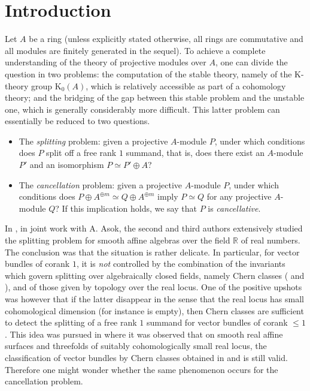 \documentclass[11pt,leqno]{amsart}
\renewcommand{\1}{{\rm 1\hspace*{-0.4ex}%
\rule{0.1ex}{1.52ex}\hspace*{0.2ex}}}
\newcommand{\<}[1]{{\langle}#1 {\rangle}}
\newcommand{\Rb}{\mathbb{R}}
\newcommand{\Kr}{\mathrm{K}}
\theoremstyle{plain}
\theoremstyle{definition}
\theoremstyle{remark}
\numberwithin{equation}{section}
\begin{document}
\section{Introduction}

Let $A$ be a ring (unless explicitly stated otherwise, all rings are commutative and all modules are finitely generated in the sequel). To achieve a complete understanding of the theory of projective modules over $A$, one can divide the question in two problems: the computation of the stable theory, namely of the $\Kr$-theory group $\mathrm{\Kr}_0(A)$, which is relatively accessible as part of a cohomology theory; and the bridging of the gap between this stable problem and the unstable one, which is generally considerably more difficult. This latter problem can essentially be reduced to two questions.
\begin{itemize}
    \item The \emph{splitting} problem: given a projective $A$-module $P$, under which conditions does $P$ split off a free rank $1$ summand, that is, does there exist an $A$-module $P'$ and an isomorphism $P\simeq P'\oplus A$?
    \item The \emph{cancellation} problem: given a projective $A$-module $P$, under which conditions does $P\oplus A^{\oplus m}\simeq Q\oplus A^{\oplus m}$ imply $P\simeq Q$ for any projective $A$-module $Q$? If this implication holds, we say that $P$ is \emph{cancellative}.
\end{itemize}
In \cite{asokSplittingVectorBundles2025}, in joint work with A. Asok, the second and third authors extensively studied the splitting problem for smooth affine algebras over the field $\Rb$ of real numbers. The conclusion was that the situation is rather delicate. In particular, for vector bundles of corank $1$, it is \emph{not} controlled by the combination of the invariants which govern splitting over algebraically closed fields, namely Chern classes (\cite{murthyZeroCyclesProjective1994} and \cite{asokCohomologicalClassificationVector2014, asokSplittingVectorBundles2014, asokP1stabilizationUnstableMotivic}), and of those given by topology over the real locus. One of the positive upshots was however that if the latter disappear in the sense that the real locus has small cohomological dimension (for instance is empty), then Chern classes are sufficient to detect the splitting of a free rank $1$ summand for vector bundles of corank $\leq 1$. This idea was pursued in \cite{lerbetCohomologicalClassificationVector2026} where it was observed that on smooth real affine surfaces and threefolds of suitably cohomologically small real locus, the classification of vector bundles by Chern classes obtained in \cite{kumarAlgebraicCyclesVector1982} and \cite{asokCohomologicalClassificationVector2014} is still valid. Therefore one might wonder whether the same phenomenon occurs for the cancellation problem.
\end{document}
